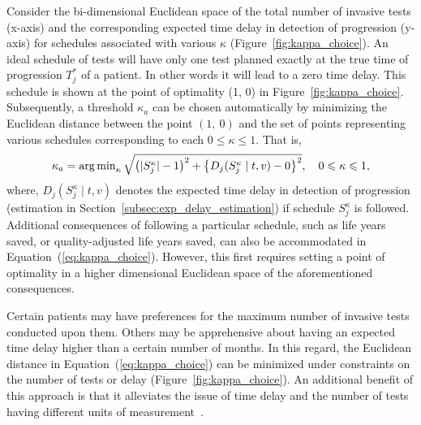Consider the bi-dimensional Euclidean space of the total number of invasive tests (x-axis) and the corresponding expected time delay in detection of progression (y-axis) for schedules associated with various $\kappa$ (Figure~\ref{fig:kappa_choice}). An ideal schedule of tests will have only one test planned exactly at the true time of progression $T^*_j$ of a patient. In other words it will lead to a zero time delay. This schedule is shown at the point of optimality (1, 0) in Figure~\ref{fig:kappa_choice}. Subsequently, a threshold $\kappa_a$ can be chosen automatically by minimizing the Euclidean distance between the point $(1,~0)$ and the set of points representing various schedules corresponding to each $0 \leq \kappa \leq 1$. That is,
\begin{equation}
\label{eq:kappa_choice}
\kappa_a = \argmin_{\kappa} \sqrt{\big(\vert S_j^\kappa \vert - 1\big)^2 + \big\{D_j(S_j^{\kappa} \mid t, v) - 0\big\}^2} , \quad 0 \leq \kappa \leq 1,
\end{equation}
where, $D_j(S_j^{\kappa} \mid t, v)$ denotes the expected time delay in detection of progression (estimation in Section~\ref{subsec:exp_delay_estimation}) if schedule $S_j^{\kappa}$ is followed. Additional consequences of following a particular schedule, such as life years saved, or quality-adjusted life years saved, can also be accommodated in Equation~(\ref{eq:kappa_choice}). However, this first requires setting a point of optimality in a higher dimensional Euclidean space of the aforementioned consequences.

Certain patients may have preferences for the maximum number of invasive tests conducted upon them. Others may be apprehensive about having an expected time delay higher than a certain number of months. In this regard, the Euclidean distance in Equation~(\ref{eq:kappa_choice}) can be minimized under constraints on the number of tests or delay (Figure~\ref{fig:kappa_choice}). An additional benefit of this approach is that it alleviates the issue of time delay and the number of tests having different units of measurement~\citep{cook1994equivalence}.

